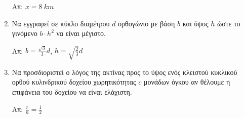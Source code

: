 \begin{enumerate}
		\hfill Απ: $ x = \SI{8}{km} $

	\item Να εγγραφεί σε κύκλο διαμέτρου $d$ ορθογώνιο με βάση $b$ και ύψος $h$
		ώστε το γινόμενο $ b\cdot h^{2} $ να είναι μέγιστο.

		\hfill Απ: $b = \frac{\sqrt{3}}{3} d$, $ h = \sqrt{\frac{2}{3}
		} d $

	\item Να προσδιοριστεί ο λόγος της ακτίνας προς το ύψος ενός κλειστού
		κυκλικού ορθού κυλινδρικού δοχείου χωρητικότητας $c$ μονάδων όγκου αν
		θέλουμε η επιφάνεια του δοχείου να είναι ελάχιστη.

		\hfill Απ: $\frac{r}{h} = \frac{1}{2} $
		
\end{enumerate}


